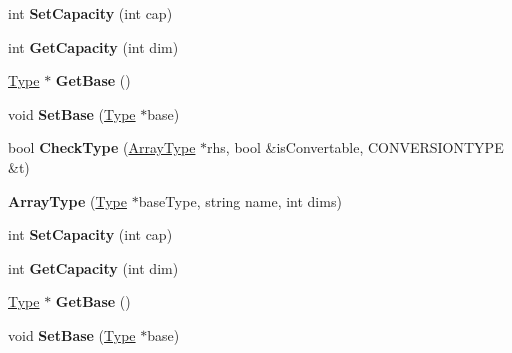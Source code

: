 \begin{DoxyCompactItemize}
\item 
\hypertarget{classArrayType_acff47fdbadc911bcb3236dcb9e8dd0a4}{int {\bfseries Set\-Capacity} (int cap)}\label{classArrayType_acff47fdbadc911bcb3236dcb9e8dd0a4}

\item 
\hypertarget{classArrayType_a97ce54630d5df790a8a706cb2f1c5751}{int {\bfseries Get\-Capacity} (int dim)}\label{classArrayType_a97ce54630d5df790a8a706cb2f1c5751}

\item 
\hypertarget{classArrayType_ac874b4e13dba44082d7eec7e057fd74c}{\hyperlink{classType}{Type} $\ast$ {\bfseries Get\-Base} ()}\label{classArrayType_ac874b4e13dba44082d7eec7e057fd74c}

\item 
\hypertarget{classArrayType_ae198281d73c175b70c41856ee9bcfbb9}{void {\bfseries Set\-Base} (\hyperlink{classType}{Type} $\ast$base)}\label{classArrayType_ae198281d73c175b70c41856ee9bcfbb9}

\item 
\hypertarget{classArrayType_ad20dee813ec90843a6333e5823e0128a}{bool {\bfseries Check\-Type} (\hyperlink{classArrayType}{Array\-Type} $\ast$rhs, bool \&is\-Convertable, C\-O\-N\-V\-E\-R\-S\-I\-O\-N\-T\-Y\-P\-E \&t)}\label{classArrayType_ad20dee813ec90843a6333e5823e0128a}

\item 
\hypertarget{classArrayType_a90aea374946e0e5cf4b89fc039969f82}{{\bfseries Array\-Type} (\hyperlink{classType}{Type} $\ast$base\-Type, string name, int dims)}\label{classArrayType_a90aea374946e0e5cf4b89fc039969f82}

\item 
\hypertarget{classArrayType_acff47fdbadc911bcb3236dcb9e8dd0a4}{int {\bfseries Set\-Capacity} (int cap)}\label{classArrayType_acff47fdbadc911bcb3236dcb9e8dd0a4}

\item 
\hypertarget{classArrayType_a97ce54630d5df790a8a706cb2f1c5751}{int {\bfseries Get\-Capacity} (int dim)}\label{classArrayType_a97ce54630d5df790a8a706cb2f1c5751}

\item 
\hypertarget{classArrayType_ac874b4e13dba44082d7eec7e057fd74c}{\hyperlink{classType}{Type} $\ast$ {\bfseries Get\-Base} ()}\label{classArrayType_ac874b4e13dba44082d7eec7e057fd74c}

\item 
\hypertarget{classArrayType_ae198281d73c175b70c41856ee9bcfbb9}{void {\bfseries Set\-Base} (\hyperlink{classType}{Type} $\ast$base)}\label{classArrayType_ae198281d73c175b70c41856ee9bcfbb9}


\end{DoxyCompactItemize}
